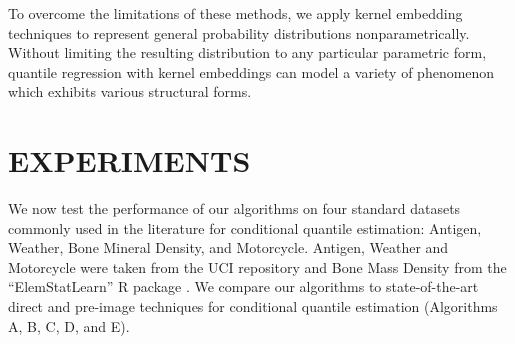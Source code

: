 \documentclass[twoside]{article} \usepackage{aistats2017}
\theoremstyle{definition}
\theoremstyle{theorem}
\begin{document}
	To overcome the limitations of these methods, we apply kernel embedding techniques to represent general probability distributions nonparametrically. Without limiting the resulting distribution to any particular parametric form, quantile regression with kernel embeddings can model a variety of phenomenon which exhibits various structural forms.
	
% 
% 
	

	
\section{EXPERIMENTS}
\label{sec:experiments}
		
	We now test the performance of our algorithms on four standard datasets commonly used in the literature for conditional quantile estimation: Antigen, Weather, Bone Mineral Density, and Motorcycle. Antigen, Weather and Motorcycle were taken from the UCI repository \citep{lichman2013uci} and Bone Mass Density from the ``ElemStatLearn'' R package \citep{hastie2005the}. We compare our algorithms to state-of-the-art direct and pre-image techniques for conditional quantile estimation (Algorithms A, B, C, D, and E).
	
%	
	
\end{document}
